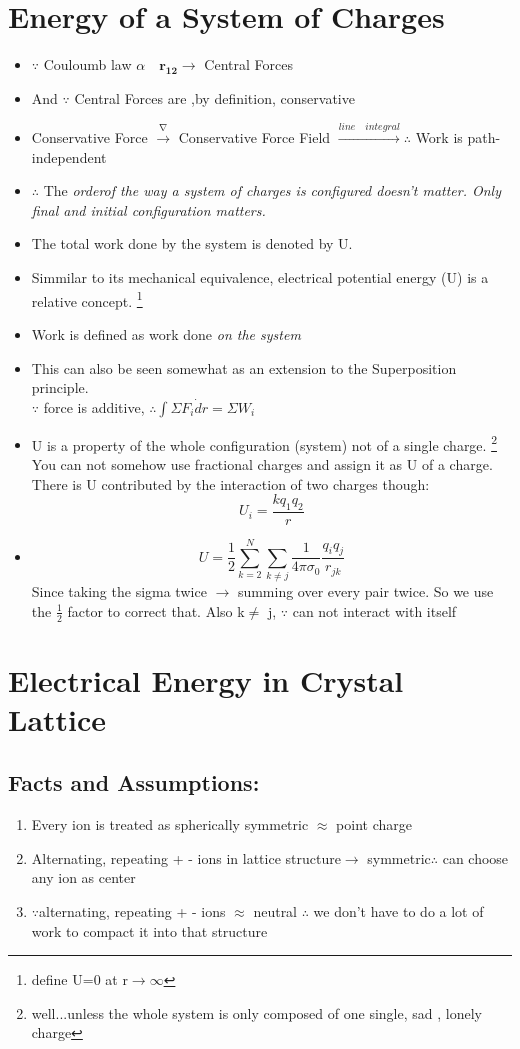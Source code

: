 \documentclass[12 pt , twoside, letterpaper] {article}
\renewcommand{\vec}[1]{\mathbf{#1}}
\begin{document}
 \section{Energy of a System of Charges}
 \begin{itemize}
 
 \item $\because$ Couloumb law $\alpha \quad \vec{r_{12}} \rightarrow$ Central Forces
 
 \item And $\because$ Central Forces are ,by definition, conservative
 \item Conservative Force $\xrightarrow{\nabla}$ Conservative Force Field $\xrightarrow{line \quad integral} \therefore$ Work is path-independent
 \item $\therefore$ The \it order\rm of the way a system of charges is configured doesn't matter. Only final and initial configuration matters.
 \item  The total work done by the system is denoted by U.
 \item Simmilar to its mechanical equivalence, electrical potential energy (U) is a relative concept. 
  \footnote{define U=0 at r$\rightarrow \infty$ }
 \item Work is defined as work done \it on \rm the system 
 \item This can also be seen somewhat as an extension to the Superposition principle. \\$\because$ force is additive, $\therefore \int \Sigma F_i \dot dr= \Sigma W_i$
 \item U is a property of the whole configuration (system) not of a single charge. \footnote{well...unless the whole system is only composed of one single, sad , lonely charge} You can not somehow use fractional charges and assign it as U of a charge. There is U contributed by the interaction of two charges though:
 $$U_i = \frac {kq_1q_2}{r}$$
 \item $$U=\frac{1}{2} \sum^{N}_{k=2} \sum_{k \neq j} \frac{1}{4 \pi \sigma_0} \frac{q_i q_j}{r_{jk}}$$ Since taking the sigma twice $\rightarrow$ summing over every pair twice. So we use the $\frac{1}{2} $ factor to correct that. Also k$\neq$ j, $\because$ can not interact with itself
  \end{itemize}
\section{Electrical Energy in Crystal Lattice}
\subsection{Facts and Assumptions:}
\begin{enumerate}
\item Every ion is treated as spherically symmetric $\approx$ point charge
\item Alternating, repeating  + - ions in lattice structure$\rightarrow$ symmetric$\therefore$ can choose any ion as center 
\item $\because $alternating, repeating  + - ions $\approx$ neutral $\therefore$ we don't have to do a lot of work to compact it into that structure
\end{enumerate}
\end{document}
